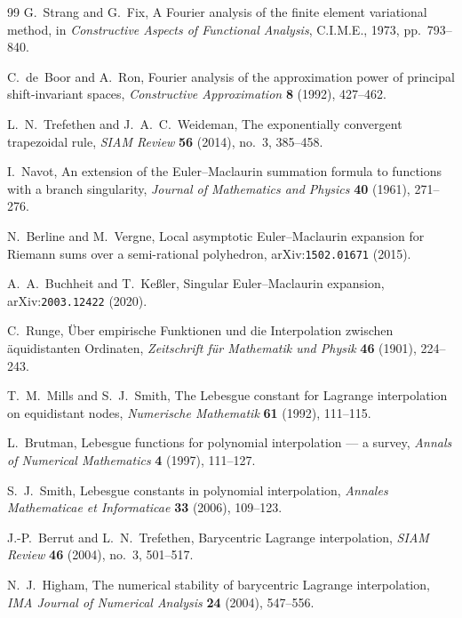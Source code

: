 \begin{thebibliography}{99}
G.~Strang and G.~Fix,
\newblock A Fourier analysis of the finite element variational
method,
\newblock in \emph{Constructive Aspects of Functional Analysis},
C.I.M.E., 1973, pp.~793--840.

C.~de~Boor and A.~Ron,
\newblock Fourier analysis of the approximation power of principal
shift-invariant spaces,
\newblock \emph{Constructive Approximation} \textbf{8} (1992),
427--462.

L.~N.~Trefethen and J.~A.~C.~Weideman,
\newblock The exponentially convergent trapezoidal rule,
\newblock \emph{SIAM Review} \textbf{56} (2014), no.~3, 385--458.

I.~Navot,
\newblock An extension of the Euler--Maclaurin summation formula to
functions with a branch singularity,
\newblock \emph{Journal of Mathematics and Physics} \textbf{40}
(1961), 271--276.

N.~Berline and M.~Vergne,
\newblock Local asymptotic Euler--Maclaurin expansion for Riemann
sums over a semi-rational polyhedron,
\newblock arXiv:\nolinkurl{1502.01671} (2015).

A.~A.~Buchheit and T.~Ke{\ss}ler,
\newblock Singular Euler--Maclaurin expansion,
\newblock arXiv:\nolinkurl{2003.12422} (2020).

C.~Runge,
\newblock \"Uber empirische Funktionen und die Interpolation
zwischen \"aquidistanten Ordinaten,
\newblock \emph{Zeitschrift f\"ur Mathematik und Physik}
\textbf{46} (1901), 224--243.

T.~M.~Mills and S.~J.~Smith,
\newblock The Lebesgue constant for Lagrange interpolation on
equidistant nodes,
\newblock \emph{Numerische Mathematik} \textbf{61} (1992), 111--115.

L.~Brutman,
\newblock Lebesgue functions for polynomial interpolation --- a
survey,
\newblock \emph{Annals of Numerical Mathematics} \textbf{4} (1997),
111--127.

S.~J.~Smith,
\newblock Lebesgue constants in polynomial interpolation,
\newblock \emph{Annales Mathematicae et Informaticae} \textbf{33}
(2006), 109--123.

J.-P.~Berrut and L.~N.~Trefethen,
\newblock Barycentric Lagrange interpolation,
\newblock \emph{SIAM Review} \textbf{46} (2004), no.~3, 501--517.

N.~J.~Higham,
\newblock The numerical stability of barycentric Lagrange
interpolation,
\newblock \emph{IMA Journal of Numerical Analysis} \textbf{24}
(2004), 547--556.


\end{thebibliography}
